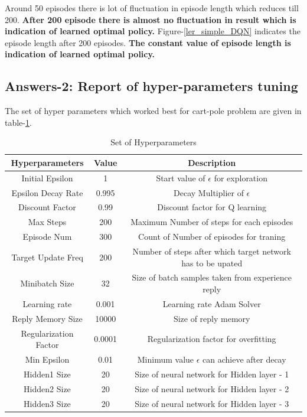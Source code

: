 \documentclass[preprint,12pt]{elsarticle}
\begin{document}
  Around 50 episodes there is lot of fluctuation in episode length which reduces till 200. \textbf{After 200 episode there is almost no fluctuation in result which is indication of learned optimal policy.} Figure-\ref{ler_simple_DQN} indicates the episode length after 200 episodes. \textbf{The constant value of episode length is indication of learned optimal policy.}

\subsection{Answers-2: Report of hyper-parameters tuning}

The set of hyper parameters which worked best for cart-pole problem are given in table-\ref{tab:hyperPara}.

\begin{table}[H]
	\begin{tabular}{|c|c|c|}
		\hline
		\textbf{Hyperparameters} & \textbf{Value} & \textbf{Description} \\ \hline
		Initial Epsilon & 1 & Start value of $\epsilon $ for exploration \\ \hline
		Epsilon Decay Rate & 0.995 & Decay Multiplier of $\epsilon$ \\ \hline
		Discount Factor & 0.99 & Discount factor for Q learning \\ \hline
		Max Steps & 200 & Maximum Number of steps for each episodes \\ \hline
		Episode Num & 300 & Count of Number of episodes for traning \\ \hline
		Target Update Freq & 200 & Number of steps after which target network has to be upated \\ \hline
		Minibatch Size & 32 & Size of batch samples taken from experience reply \\ \hline
		Learning rate & 0.001 & Learning rate Adam Solver \\ \hline
		Reply Memory Size & 10000 & Size of reply memory \\ \hline
		Regularization Factor & 0.0001 & Regularization factor for overfitting \\ \hline
		Min Epsilon & 0.01 & Minimum value $\epsilon$ can achieve after decay \\ \hline
		Hidden1 Size & 20 & Size of neural network for Hidden layer - 1 \\ \hline
		Hidden2 Size & 20 & Size of neural network for Hidden layer - 2 \\ \hline
		Hidden3 Size & 20 & Size of neural network for Hidden layer - 3 \\ \hline
	\end{tabular}
	\vspace{1mm}
	\caption{Set of Hyperparameters}
	\label{tab:hyperPara}
\end{table}
\end{document}
